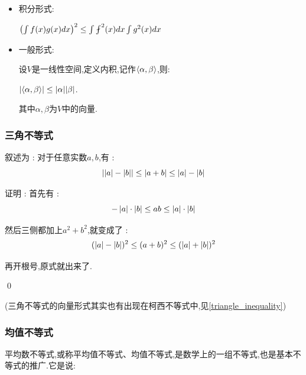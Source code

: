 {{{\begin{itemize}
{              在三角形$ABC$中,这个式子可以写作:$||\vec{AB}|| + ||\vec{BC}|| \geq ||\vec{AC}|| = \doubleAbsoluteValue{\doubleAbsoluteValue{\vec{AB}} + \doubleAbsoluteValue{\vec{BC}}}$

              也就是说:$\sqrt{a^2 + b^2} + \sqrt{c^2 + d^2} \geq \sqrt{(a - c)^2 + (b - d)^2}$

              等号成立的条件为:$ad = bc \land ac + bc \geq 0$(即$\cfrac{a}{c} = \cfrac{b}{d}$).

              }
        \item {
              积分形式:

              $\bigCase{\int\defFunction{x}g(x)dx}^2 \leq \int\fint^2(x)dx \int g^2(x)dx$
              }
        \item {
              一般形式:

              设$V$是一线性空间,定义内积,记作$\langle\alpha,\beta\rangle$,则:

              $|\langle\alpha,\beta\rangle| \leq |\alpha||\beta|$.

              其中$\alpha,\beta$为$V$中的向量.
              }
    \end{itemize}
}\label{triangle_inequality}%

\subsubsection{三角不等式}{
    叙述为 : 对于任意实数$a,b$,有 :
    $$
        \left\lvert \left\lvert a \right\vert - \left\lvert b \right\vert \right\vert \leq \left\lvert a + b \right\vert \leq \left\lvert a \right\vert - \left\lvert b \right\vert
    $$

    证明 : 首先有 : $$
        -\left\lvert a \right\vert\cdot\left\lvert b \right\vert \leq ab \leq \left\lvert a \right\vert\cdot\left\lvert b \right\vert
    $$

    然后三侧都加上$a^2 + b^2$,就变成了 : $$
        (\left\lvert a \right\vert - \left\lvert b \right\vert)^2 \leq (a + b)^2 \leq (\left\lvert a \right\vert + \left\lvert b \right\vert)^2
    $$

    再开根号,原式就出来了.

    \qed

    (三角不等式的向量形式其实也有出现在柯西不等式中,见{\ref{triangle_inequality}})
}

\subsubsection{均值不等式}{
平均数不等式,或称平均值不等式、均值不等式,是数学上的一组不等式,也是基本不等式的推广.它是说:

}}}
